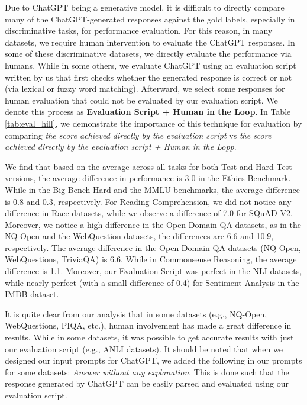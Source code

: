 \documentclass[11pt]{article}
\begin{document}
 
Due to ChatGPT being a generative model, it is difficult to directly compare many of the ChatGPT-generated responses against the gold labels, especially in discriminative tasks, for performance evaluation. For this reason, in many datasets, we require human intervention to evaluate the ChatGPT responses. In some of these discriminative datasets, we directly evaluate the performance via humans. While in some others, we evaluate ChatGPT using an evaluation script written by us that first checks whether the generated response is correct or not (via lexical or fuzzy word  matching). Afterward, we select some responses for human evaluation that could not be evaluated by our evaluation script. We denote this process as \textbf{Evaluation Script + Human in the Loop}. In Table \ref{tab:eval_hill}, we demonstrate the importance of this technique for evaluation by comparing \textit{the score achieved directly by the evaluation script} vs \textit{the score achieved directly by the evaluation script + Human in the Lopp}. 

We find that based on the average across all tasks for both Test and Hard Test versions, the average difference in performance is 3.0 in the Ethics Benchmark. While in the Big-Bench Hard and the MMLU benchmarks, the average difference is 0.8 and 0.3, respectively. For Reading Comprehension, we did not notice any difference in Race datasets, while we observe a difference of 7.0 for SQuAD-V2. Moreover, we notice a high difference in the Open-Domain QA datasets, as in the NQ-Open and the WebQuestion datasets, the differences are 6.6 and 10.9, respectively. The average difference in the Open-Domain QA datasets (NQ-Open, WebQuestions, TriviaQA) is 6.6. While in Commonsense Reasoning, the average difference is 1.1. Moreover, our Evaluation Script was perfect in the NLI datasets, while nearly perfect (with a small difference of 0.4) for Sentiment Analysis in the IMDB dataset.

It is quite clear from our analysis that in some datasets (e.g., NQ-Open, WebQuestions, PIQA, etc.), human involvement has made a great difference in results. While in some datasets, it was possible to get accurate results with just our evaluation script (e.g., ANLI datasets). It should be noted that when we designed our input prompts for ChatGPT, we added the following in our prompts for some datasets: \emph{Answer without any explanation}. This is done such that the response generated by ChatGPT can be easily parsed and evaluated using our evaluation script. 
\end{document}
